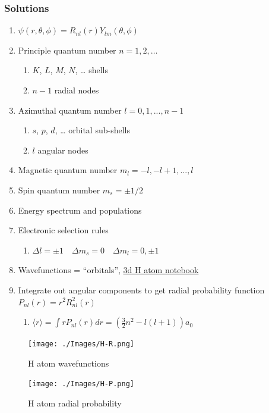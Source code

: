\documentclass[11pt]{article}
\begin{document}
\subsubsection{Solutions}
\label{sec:orgf1b3527}
\begin{enumerate}
\item \(\psi(r,\theta,\phi)=R_{nl}(r)Y_{lm}(\theta,\phi)\)
\item Principle quantum number \(n=1,2,\ldots\)
\begin{enumerate}
\item \(K\), \(L\), \(M\), \(N\), \ldots{} shells
\item \(n-1\) radial nodes
\end{enumerate}
\item Azimuthal quantum number \(l=0,1,...,n-1\)
\begin{enumerate}
\item \(s\), \(p\), \(d\), \ldots{} orbital sub-shells
\item \(l\) angular nodes
\end{enumerate}
\item Magnetic quantum number \(m_l=-l,-l+1,...,l\)
\item Spin quantum number \(m_s=\pm 1/2\)
\item Energy spectrum and populations
\item Electronic selection rules
\begin{enumerate}
\item \(\Delta l=\pm 1 \quad \Delta m_s =0 \quad \Delta m_l = 0,\pm 1\)
\end{enumerate}
\item Wavefunctions = ``orbitals'',  \href{https://colab.research.google.com/github/wmfschneider/CHE30324/blob/master/Resources/Hydrogen\_3d.ipynb}{3d H atom notebook}
\item Integrate out angular components to get radial probability function \(P_{nl}(r)=r^2 R_{nl}^2(r)\)
\begin{enumerate}
\item \(\langle r\rangle = \int r P_{nl}(r) dr = \left(\frac{3}{2}n^2-l(l+1)\right)a_0\)
\end{enumerate}
\end{enumerate}

\begin{figure}[htbp]
\centering
\texttt{[image: ./Images/H-R.png]}
\caption{H atom wavefunctions}
\end{figure} 
\begin{figure}[htbp]
\centering
\texttt{[image: ./Images/H-P.png]}
\caption{H atom radial probability}
\end{figure} 
\end{document}
